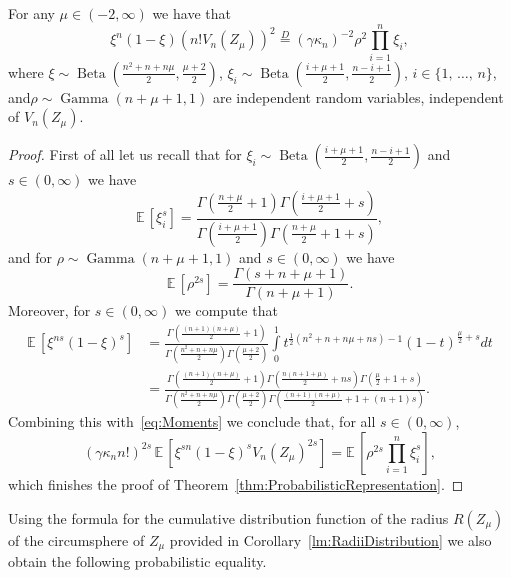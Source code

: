 \documentclass[AHL,Unicode,longabstracts,published]{cedram}
\newcommand{\EE}{\mathbb{E}\,}
\newcommand{\Gam}{\mathop{\mathrm{Gamma}}\nolimits}
\newcommand{\Bet}{\mathop{\mathrm{Beta}}\nolimits}
\newcommand{\eqdistr}{\stackrel{D}{=}}
\begin{document}
\begin{theo}\label{thm:ProbabilisticRepresentation}
For any $\mu\in(-2,\infty)$ we have that
\[
\xi^n(1-\xi)\left(n!V_n(Z_{\mu})\right)^2\eqdistr (\gamma\kappa_n)^{-2}\rho^2\prod\limits_{i=1}^n\xi_i,
\]
where $\xi\sim\Bet(\frac{n^2+n+n\mu}{2}, \frac{\mu+2}{2})$, $\xi_i\sim\Bet(\frac{i+\mu+1}{2}, \frac{n-i+1}{2})$, $i\in\{1,\,\ldots,\,n\}$, and\linebreak$\rho\sim\Gam(n+\mu+1,1)$ are independent random variables, independent of $V_n(Z_{\mu})$.
\end{theo}

\begin{proof}
First of all let us recall that for $\xi_i\sim\Bet(\frac{i+\mu+1}{2}, \frac{n-i+1}{2})$ and $s\in(0,\infty)$ we have
\[
\EE[\xi_i^{s}]=\frac{\Gamma\left(\frac{n+\mu}{2}+1\right)\Gamma\left(\frac{i+\mu+1}{2}+s\right)}{\Gamma\left(\frac{i+\mu+1}{2}\right)\Gamma\left(\frac{n+\mu}{2}+1+s\right)},
\]
and for $\rho\sim\Gam(n+\mu+1,1)$ and $s\in(0,\infty)$ we have
\[
\EE\left[\rho^{2s}\right]=\frac{\Gamma(s+n+\mu+1)}{\Gamma(n+\mu+1)}.
\]
Moreover, for $s\in(0,\infty)$ we compute that
\begin{align*}
\EE\left[\xi^{ns}(1-\xi)^s\right]&=\frac{\Gamma\left(\frac{(n+1)(n+\mu)}{2}+1\right)}{\Gamma\left(\frac{n^2+n+n\mu}{2}\right)\Gamma\left(\frac{\mu+2}{2}\right)}\int\limits_{0}^1t^{\frac{1}{2}(n^2+n+n\mu+ns)-1}(1-t)^{\frac{\mu}{2} +s}dt\\
&=\frac{\Gamma\left(\frac{(n+1)(n+\mu)}{2}+1\right)\Gamma\left(\frac{n(n+1+\mu)}{2}+ns\right)\Gamma\left(\frac{\mu}{2}+1+s\right)}{\Gamma\left(\frac{n^2+n+n\mu}{2}\right)\Gamma\left(\frac{\mu+2}{2}\right)\Gamma\left(\frac{(n+1)(n+\mu)}{2}+1+(n+1)s\right)}.
\end{align*}
Combining this with~\eqref{eq:Moments} we conclude that, for all $s\in(0,\infty)$,
\[
(\gamma\kappa_n n!)^{2s}\,\EE\left[\xi^{sn}(1-\xi)^sV_n(Z_{\mu})^{2s}\right]=\EE\left[\rho^{2s}\prod\limits_{i=1}^n\xi_i^s\right],
\]
which finishes the proof of Theorem~\ref{thm:ProbabilisticRepresentation}.
\end{proof}

Using the formula for the cumulative distribution function of the radius $R(Z_{\mu})$ of the circumsphere of $Z_{\mu}$ provided in Corollary~\ref{lm:RadiiDistribution} we also obtain the following probabilistic equality.
\end{document}

